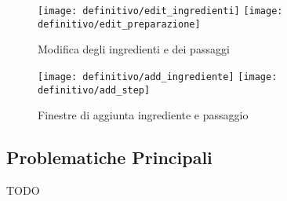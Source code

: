 \begin{figure}[ht]
  \begin{center}
    \texttt{[image: definitivo/edit\_ingredienti]}
    \texttt{[image: definitivo/edit\_preparazione]}
    \caption{Modifica degli ingredienti e dei passaggi}
    \label{fig:def_edit_ricetta}
  \end{center}
\end{figure}

\begin{figure}[ht]
  \begin{center}
    \texttt{[image: definitivo/add\_ingrediente]}
    \texttt{[image: definitivo/add\_step]}
    \caption{Finestre di aggiunta ingrediente e passaggio}
    \label{fig:def_edit_ricetta_1}
  \end{center}
\end{figure}

\clearpage
\subsection{Problematiche Principali}
TODO
